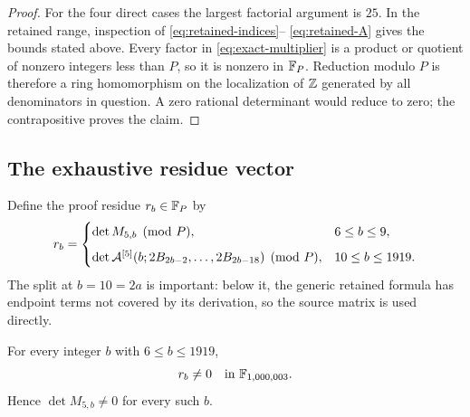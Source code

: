 \begin{proof}
For the four direct cases the largest factorial argument is $25$.  In
the retained range, inspection of \eqref{eq:retained-indices}--
\eqref{eq:retained-A} gives the bounds stated above.  Every factor in
\eqref{eq:exact-multiplier} is a product or quotient of nonzero
integers less than $P$, so it is nonzero in $\mathbb{F}_P$.  Reduction modulo
$P$ is therefore a ring homomorphism on the localization of $\mathbb{Z}$
generated by all denominators in question.  A zero rational determinant
would reduce to zero; the contrapositive proves the claim.
\end{proof}

\subsection{The exhaustive residue vector}

Define the proof residue $r_b\in\mathbb{F}_P$ by
\begin{equation}
 r_b=
 \begin{cases}
  \det M_{5,b}\pmod P,&6\le b\le9,\\[2mm]
  \det\mathcal{A}^{[5]}(b;2B_{2b-2},\ldots,2B_{2b-18})\pmod P,
      &10\le b\le1919.
 \end{cases}
 \label{eq:proof-residue}
\end{equation}
The split at $b=10=2a$ is important: below it, the generic retained
formula has endpoint terms not covered by its derivation, so the source
matrix is used directly.

\begin{theorem}
\label{thm:finite-order-ten}
For every integer $b$ with $6\le b\le1919$,
\begin{equation}
 r_b\ne0\quad\text{in }\mathbb{F}_{1{,}000{,}003}.
 \label{eq:all-residues-nonzero}
\end{equation}
Hence $\det M_{5,b}\ne0$ for every such $b$.
\end{theorem}

